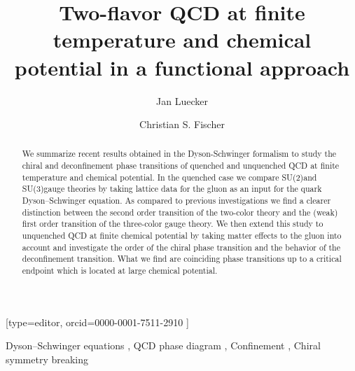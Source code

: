 \documentclass[a4paper,fleqn]{cas-dc}
\begin{document}
\let\WriteBookmarks\relax
\def\floatpagepagefraction{1}
\def\textpagefraction{.001}

\title [mode = title]{Two-flavor QCD at finite temperature and chemical potential in a functional approach}                      


\author[1]{Jan Luecker}[type=editor,
                        orcid=0000-0001-7511-2910 ]
\cormark[1]

\address[1]{Institut f{\"u}r Theoretische Physik, Justus-Liebig-Universit{\"a}t Gie{\ss}en, Heinrich-Buff-Ring 16, D-35392 Gie{\ss}en, Germany}

\author[1,2]{Christian S. Fischer}

\address[2]{GSI Helmholtzzentrum f{\"u}r Schwerionenforschung GmbH, Planckstr., 1 D-64291 Darmstadt, Germany}


\begin{abstract}
We summarize recent results obtained in the Dyson-Schwinger formalism to study
the chiral and deconfinement phase transitions of quenched and unquenched QCD at
finite temperature and chemical potential. In the quenched case we compare SU(2)and
SU(3)gauge theories by taking lattice data for the gluon as an input for the quark
Dyson–Schwinger equation. As compared to previous investigations we find a clearer
distinction between the second order transition of the two-color theory and the (weak) first
order transition of the three-color gauge theory. We then extend this study to unquenched
QCD at finite chemical potential by taking matter effects to the gluon into account and
investigate the order of the chiral phase transition and the behavior of the deconfinement
transition. What we find are coinciding phase transitions up to a critical endpoint which is
located at large chemical potential.

\end{abstract}

\begin{keywords}
Dyson–Schwinger equations \sep 
QCD phase diagram \sep 
Confinement \sep 
Chiral symmetry breaking
\end{keywords}


\maketitle
\end{document}
